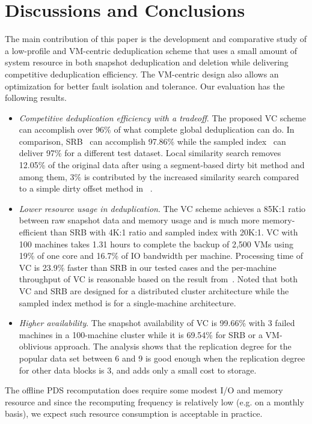 \section{Discussions and Conclusions}
\label{sect:conclusion}
The main contribution of this paper is the development and comparative study of a low-profile and VM-centric deduplication scheme that
uses  a small amount of system resource in both snapshot deduplication and deletion
while delivering competitive deduplication efficiency.
The VM-centric design also allows an optimization for  better fault isolation and tolerance.
Our evaluation has the following results.
\begin{itemize}
\item {\em Competitive deduplication efficiency with a tradeoff}. 
The proposed VC scheme 
can accomplish over  96\% of what complete global
deduplication can do. In comparison, SRB~\cite{Dong2011,extreme_binning09}
can accomplish 97.86\% while 
the sampled index~\cite{Guo2011} can deliver 97\% for a different test dataset. 
Local similarity search removes 12.05\% of the original data after using a segment-based
 dirty bit method and among them, 3\% is contributed by the increased similarity search compared to
a simple dirty offset method in ~\cite{WeiZhangIEEE}.
\item {\em Lower resource usage in deduplication}. 
The VC scheme achieves a 85K:1 ratio between raw snapshot data and memory usage
and is much more memory-efficient than 
SRB  with 4K:1 ratio and sampled index with 20K:1.
VC with 100 machines takes 1.31 hours to complete the backup of 2,500 VMs
using 19\% of one core and 16.7\% of IO bandwidth per machine. 
Processing time of VC is 23.9\% faster  than SRB in our tested cases
and the per-machine throughput of VC is reasonable based on the result 
from~\cite{Guo2011}. 
Noted that both VC and SRB are designed for a distributed cluster architecture while
the sampled index method is for a single-machine architecture.
\item {\em Higher availability}. 
The snapshot availability of VC is 99.66\% with 3 failed machines in a 100-machine cluster
while it is 69.54\% for  SRB or a VM-oblivious approach.
The analysis shows that the replication degree
for the popular data set between 6 and 9 is good enough when the replication degree
for other data blocks is 3, and adds only a small cost to storage.
\end{itemize}
The offline PDS recomputation does require some modest I/O and memory resource and 
since the recomputing frequency is relatively low (e.g. on a monthly basis), we expect such resource
consumption is acceptable in practice.

